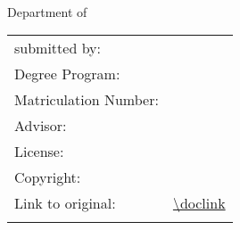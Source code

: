 \begin{titlepage}
	\begin{center}
		\huge{\rmfamily\textbf{\doctitle}}\\[8ex] %
		\Large{\textbf{\docworktype}}\\[1.5ex] %
		\Large{\docinstitution}\\
		\Large{Department of \docdepartment}\\[11ex]
		\normalsize
		\begin{table}[H]
			\centering
			\begin{tabular}{ll}
				submitted by:  & \quad \docauthor\\[1.2ex]
				Degree Program: & \quad \docdegreeprogramm\\[1.2ex]
				Matriculation Number: & \quad \docmatriculationnumber\\[1.2ex]
				Advisor:  & \quad \docadvisor\\[8ex] %
				License:  & \quad \doclicense\\[1.2ex]
				Copyright:  & \quad \doccopyright\\[1.2ex]
				Link to original:  & \quad \url{\doclink}\\[1.2ex]
				\\[26ex]
			\end{tabular}
		\end{table}
		\docdate %
	\end{center}
\end{titlepage}
%